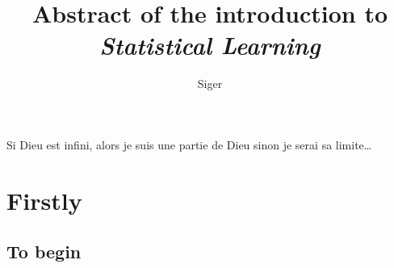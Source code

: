 \documentclass[a4paper, 10pt]{report}
\title{Abstract of the introduction to \emph{Statistical Learning}}
\author{Siger}
\begin{document}
\maketitle

Si Dieu est infini, alors je suis une partie de Dieu sinon je serai sa limite\ldots


\tableofcontents

\chapter{Firstly}
\section{To begin}
\end{document}
